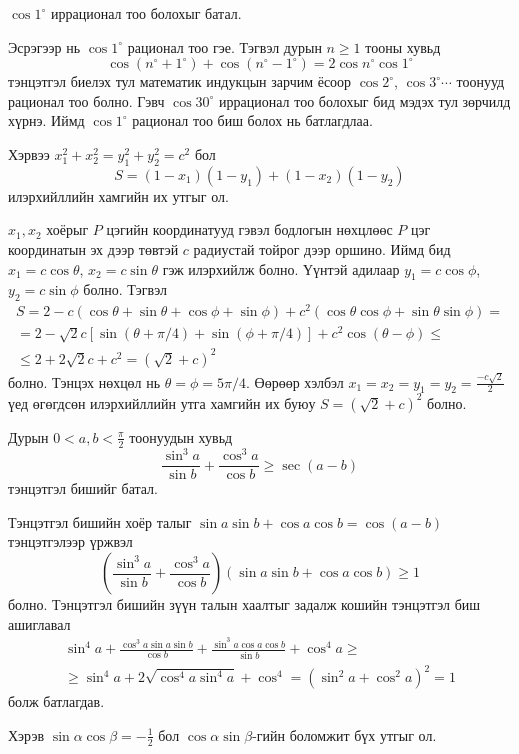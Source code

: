 \documentclass[10pt,a4paper,oneside]{book}
\begin{document}
\Problem
$\cos 1^\circ$ иррационал тоо болохыг батал.

\TheSolution
Эсрэгээр нь $\cos 1^\circ$ рационал тоо гэе. Тэгвэл дурын $n \geq 1$  тооны хувьд
\begin{equation*}
\cos (n^\circ + 1^\circ) + \cos (n^\circ - 1^\circ) = 2\cos n^\circ \cos 1^\circ
\end{equation*}
тэнцэтгэл биелэх тул математик индукцын зарчим ёсоор $\cos 2^\circ$, $\cos 3^\circ \cdots$  тоонууд рационал тоо болно. Гэвч $\cos 30^\circ$ иррационал тоо болохыг бид мэдэх тул зөрчилд хүрнэ. Иймд $\cos 1^\circ$ рационал тоо биш болох нь батлагдлаа.

 Хэрвээ $x_1^2 + x_2^2 = y_1^2 + y_2^2 = c^2$ бол
\begin{equation*}
S = (1-x_1)(1-y_1) + (1-x_2)(1-y_2)
\end{equation*}
илэрхийллийн хамгийн их утгыг ол.

\TheSolution
$x_1, x_2$ хоёрыг $P$ цэгийн координатууд гэвэл бодлогын нөхцлөөс $P$ цэг координатын эх дээр төвтэй $c$ радиустай тойрог дээр оршино. Иймд бид $x_1 = c\cos \theta$, $x_2 = c\sin \theta$ гэж илэрхийлж болно. Үүнтэй адилаар $y_1 = c\cos \phi$, $y_2 = c\sin \phi$ болно. Тэгвэл
\begin{align*}
S = 2-c(\cos \theta + \sin \theta + \cos \phi + \sin \phi) + c^2 (\cos \theta\cos \phi + \sin \theta \sin \phi) = \\
 = 2 - \sqrt{2}c\left[\sin(\theta + \pi/4) + \sin(\phi + \pi/4)\right] + c^2 \cos(\theta - \phi) \leq \\
 \leq 2 + 2\sqrt{2}c + c^2 = (\sqrt{2} + c)^2
\end{align*}
болно. Тэнцэх нөхцөл нь $\theta = \phi = 5\pi/4$. Өөрөөр хэлбэл $x_1 = x_2 = y_1 = y_2 = \frac{-c\sqrt{2}}{2}$ үед өгөгдсөн илэрхийллийн утга хамгийн их буюу $S = (\sqrt{2}+ c)^2$ болно.

\Problem
Дурын $0<a, b < \frac{\pi}{2}$ тоонуудын хувьд
\begin{equation*}
\frac{\sin^3 a}{\sin b} + \frac{\cos^3 a}{\cos b} \geq \sec(a-b)
\end{equation*}
тэнцэтгэл бишийг батал.

\TheSolution
Тэнцэтгэл бишийн хоёр талыг $\sin a\sin b + \cos a\cos b = \cos(a-b)$ тэнцэтгэлээр үржвэл
\begin{equation*}
\left(\frac{\sin^3 a}{\sin b} + \frac{\cos^3 a}{\cos b}\right)\left(\sin a \sin b + \cos a \cos b\right) \geq 1
\end{equation*}
болно. Тэнцэтгэл бишийн зүүн талын хаалтыг задалж кошийн тэнцэтгэл биш ашиглавал
\begin{align*}
\sin^4 a + \frac{\cos^3 a \sin a \sin b}{\cos b} + \frac{\sin^3 a\cos a \cos b}{\sin b} + \cos^4 a \geq \\
\geq \sin^4 a + 2\sqrt{\cos^4 a\sin^4 a} + \cos^4 = (\sin^2 a + \cos^2 a)^2 = 1
\end{align*}
болж батлагдав.

\Problem
Хэрэв $\sin \alpha \cos \beta = -\frac{1}{2}$ бол $\cos \alpha \sin \beta$-гийн боломжит бүх утгыг ол.

\TheSolution
\end{document}
